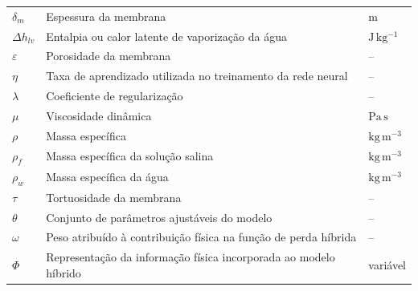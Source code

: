 \begin{longtable}{>{\raggedright\arraybackslash}p{3cm}
                  >{\raggedright\arraybackslash}p{9.5cm}
                  >{\raggedright\arraybackslash}p{3cm}}
$\delta_m$ & Espessura da membrana & $\mathrm{m}$ \\

$\Delta h_{lv}$ & Entalpia ou calor latente de vaporização da água & $\mathrm{J\,kg^{-1}}$ \\

$\varepsilon$ & Porosidade da membrana & -- \\

$\eta$ & Taxa de aprendizado utilizada no treinamento da rede neural & -- \\

$\lambda$ & Coeficiente de regularização & -- \\

$\mu$ & Viscosidade dinâmica & $\mathrm{Pa\,s}$ \\

$\rho$ & Massa específica & $\mathrm{kg\,m^{-3}}$ \\

$\rho_f$ & Massa específica da solução salina & $\mathrm{kg\,m^{-3}}$ \\

$\rho_w$ & Massa específica da água & $\mathrm{kg\,m^{-3}}$ \\

$\tau$ & Tortuosidade da membrana & -- \\

$\theta$ & Conjunto de parâmetros ajustáveis do modelo & -- \\

$\omega$ & Peso atribuído à contribuição física na função de perda híbrida & -- \\

$\Phi$ & Representação da informação física incorporada ao modelo híbrido & variável \\

\end{longtable}